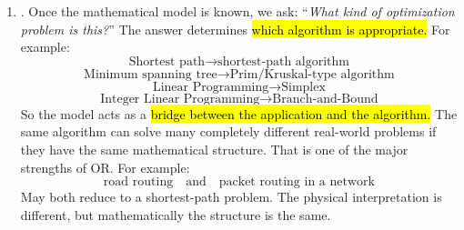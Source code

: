 \begin{enumerate}
        For example, suppose:
        \begin{equation*}
            x_1=\text{number of units of product 1},
            \quad
            x_2=\text{number of units of product 2}
        \end{equation*}
        If profits are $5$ and $8$, we may write:
        \begin{equation*}
            \max 5x_1+8x_2
        \end{equation*}
        If total available production time is $100$, we might have:
        \begin{equation*}
            2x_1+4x_2\le 100
        \end{equation*}
        The real problem has now become an \textbf{optimization model}. So:
        \begin{equation*}
            \text{natural language}
            \to
            \text{mathematical language}
        \end{equation*}
        This modeling step is one of the main skills the FOR course aims to teach.

    \item {}. Once the mathematical model is known, we ask: ``\emph{What kind of optimization problem is this?}'' The answer determines \hl{which algorithm is appropriate.} For example:
        \begin{equation*}
            \text{Shortest path} \to \text{shortest-path algorithm}
        \end{equation*}
        \begin{equation*}
            \text{Minimum spanning tree} \to \text{Prim/Kruskal-type algorithm}
        \end{equation*}
        \begin{equation*}
            \text{Linear Programming} \to \text{Simplex}
        \end{equation*}
        \begin{equation*}
            \text{Integer Linear Programming} \to \text{Branch-and-Bound}
        \end{equation*}
        So the model acts as a \hl{bridge between the application and the algorithm.} The same algorithm can solve many completely different real-world problems if they have the same mathematical structure. That is one of the major strengths of OR. For example:
        \begin{equation*}
            \text{road routing}
            \quad\text{and}\quad
            \text{packet routing in a network}
        \end{equation*}
        May both reduce to a shortest-path problem. The physical interpretation is different, but mathematically the structure is the same.


\end{enumerate}
